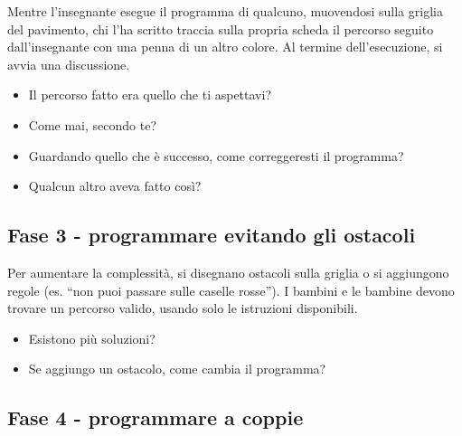 Mentre l'insegnante esegue il programma di qualcuno, muovendosi sulla griglia del pavimento, chi l'ha scritto traccia sulla propria scheda il percorso seguito dall'insegnante con una penna di un altro colore. Al termine dell'esecuzione, si avvia una discussione.

\begin{domandestimolo}\label{domande-stimolo-5}

\begin{itemize}
\item
  Il percorso fatto era quello che ti aspettavi?
\item
  Come mai, secondo te?
\item
  Guardando quello che è successo, come correggeresti il programma?
\item
  Qualcun altro aveva fatto così?
\end{itemize}
\end{domandestimolo}

\subsection{Fase 3 - programmare evitando gli ostacoli }\label{fase-3---programmare-evitando-gli-ostacoli}

\ruoliattivita{\ruoloProgrammatore}



Per aumentare la complessità, si disegnano ostacoli sulla griglia o si aggiungono regole (es. ``non puoi passare sulle caselle rosse''). I bambini e le bambine devono trovare un percorso valido, usando solo le istruzioni disponibili.

\begin{domandestimolo}\label{domande-stimolo-6}

\begin{itemize}
\item
  Esistono più soluzioni?
\item
  Se aggiungo un ostacolo, come cambia il programma?
\end{itemize}
\end{domandestimolo}


\newpage
\subsection{Fase 4 - programmare a coppie }\label{fase-4---programmare-a-coppie}

\ruoliattivita{\ruoloProgrammatore\quad\ruoloEsecutore}

